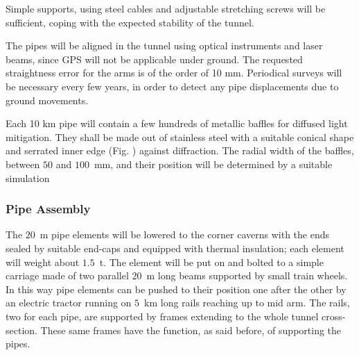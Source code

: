Simple supports, using steel cables and adjustable stretching screws will be sufficient, coping with the expected stability of the tunnel. 

The pipes will be aligned in the tunnel using optical instruments and laser beams, since GPS will not be applicable under ground. The requested straightness error for the arms is of the order of 10 mm. Periodical surveys will be necessary every few years, in order to detect any pipe displacements due to ground movements. 

Each 10 km pipe will contain a few hundreds of metallic baffles for diffused light mitigation. They shall be made out of stainless steel with a suitable conical shape and serrated inner edge (Fig. %
) against diffraction. The radial width of the baffles, between $50$ and $100$~mm, and their position will be determined by a suitable simulation %

\subsubsection{Pipe Assembly} 
The $20$~m pipe elements will be lowered to the corner caverns with the ends sealed by suitable end-caps and equipped with thermal insulation; each element will weight about $1.5$~t. The element will be put on and bolted to a simple carriage made of two parallel $20$~m long beams supported by small train wheels. In this way pipe elements can be pushed to their position one after the other by an electric tractor running on $5$~km long rails reaching up to mid arm. The rails, two for each pipe, are supported by frames extending to the whole tunnel cross-section. These same frames have the function, as said before, of supporting the pipes. 


